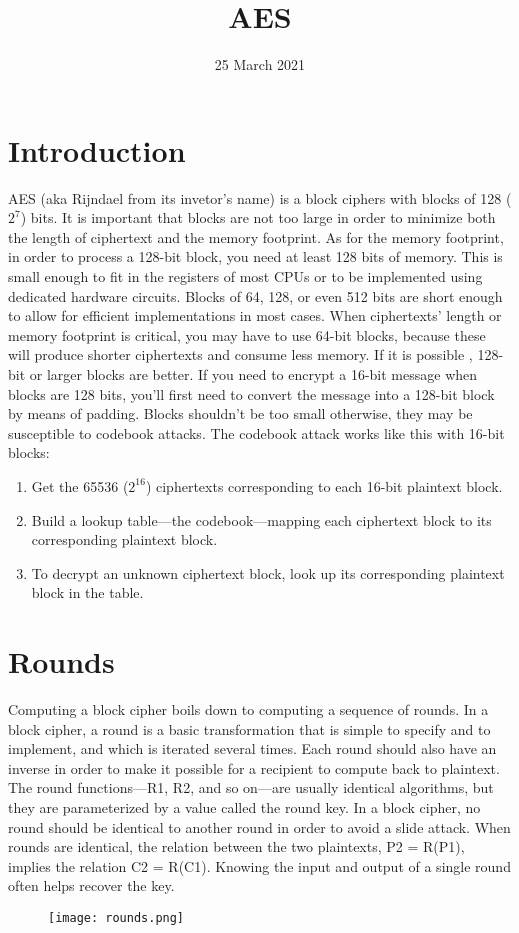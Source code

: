 \documentclass{article}
\title{AES}
\author{}
\date{25 March 2021}
\begin{document}
\maketitle
\section*{Introduction}
AES (aka Rijndael from its invetor's name) is a block ciphers  with blocks of 128 ($2^7$) bits. It is important that blocks are not too large in order to minimize both the length of ciphertext and the memory footprint.
As for the memory footprint, in order to process a 128-bit block, you need at least 128 bits of memory. This is small enough to fit in the registers of most CPUs or to be implemented using dedicated hardware circuits. Blocks of 64, 128, or even 512 bits are short enough to allow for efficient implementations in most cases.
When ciphertexts’ length or memory footprint is critical, you may have to use 64-bit blocks, because these will produce shorter ciphertexts and consume less memory. If it is possible , 128-bit or larger blocks are better. If you need to encrypt a 16-bit message when blocks are 128 bits, you’ll first need to convert the message into a 128-bit block by means of padding. Blocks shouldn’t be too small otherwise, they may be susceptible to codebook attacks. The codebook attack works like this with 16-bit blocks:
\begin{enumerate}
	\item Get the 65536 ($2^16$) ciphertexts corresponding to each 16-bit plaintext block.
	\item Build a lookup table—the codebook—mapping each ciphertext block to its corresponding plaintext block.
	\item To decrypt an unknown ciphertext block, look up its corresponding	plaintext block in the table.
\end{enumerate}
\section*{Rounds}
Computing a block cipher boils down to computing a sequence of rounds.
In a block cipher, a round is a basic transformation that is simple to specify and to implement, and which is iterated several times. Each round should also have an inverse in order to make it possible for a recipient to compute back to plaintext. The round functions—R1, R2, and so on—are usually identical algorithms, but they are parameterized by a value called the round key.
In a block cipher, no round should be identical to another round in order to avoid a slide attack. When rounds are identical, the relation between the two plaintexts, P2 = R(P1), implies the relation C2 = R(C1). Knowing the input and output of a single round often helps recover the key.
\begin{figure}[htb]
	\begin{center}
  		\texttt{[image: rounds.png]} 
 	\end{center}
\end{figure}
\end{document}
